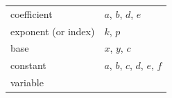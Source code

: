 {{\begin{center}
\begin{xtabular}[t]{|l|l|}
     \tabularnewline{}
        coefficient &
        $a$, $b$, $d$, $e$%
     \tabularnewline{}
        exponent (or index) &
        $k$, $p$%
     \tabularnewline{}
        base &
        $x$, $y$, $c$%
     \tabularnewline{}
        constant &
        $a$, $b$, $c$, $d$, $e$, $f$%
     \tabularnewline{}
        variable &

\end{xtabular}
\end{center}}}
